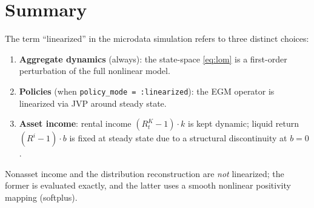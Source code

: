 \documentclass[11pt]{article}
\begin{document}
\section{Summary}

The term ``linearized'' in the microdata simulation refers to three distinct
choices:
\begin{enumerate}
    \item \textbf{Aggregate dynamics} (always): the state-space \eqref{eq:lom}
          is a first-order perturbation of the full nonlinear model.
    \item \textbf{Policies} (when \texttt{policy\_mode = :linearized}):
          the EGM operator is linearized via JVP around steady state.
    \item \textbf{Asset income}: rental income $(R^K_t - 1)\cdot k$ is kept
          dynamic; liquid return $(R^i - 1)\cdot b$ is fixed at steady state
          due to a structural discontinuity at $b=0$.
\end{enumerate}
Nonasset income and the distribution reconstruction are \emph{not} linearized;
the former is evaluated exactly, and the latter uses a smooth nonlinear
positivity mapping (softplus).
\end{document}
